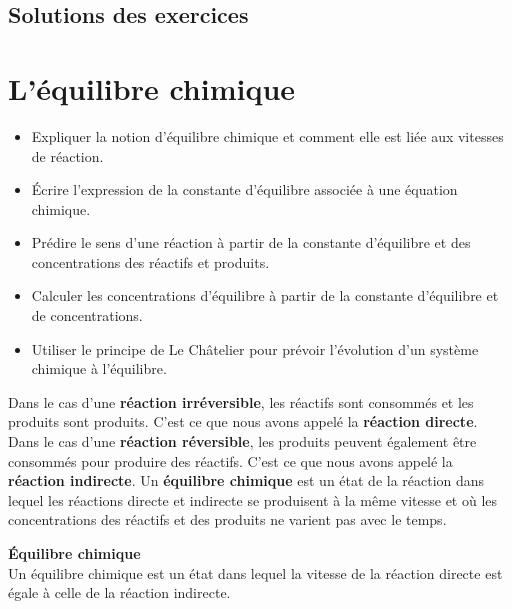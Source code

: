 \documentclass[
  11pt,
  french,
  a4paper,
  openany]{book}
\providecommand{\tightlist}{%
  \setlength{\itemsep}{0pt}\setlength{\parskip}{0pt}}
\begin{document}
\section{Solutions des exercices} \shipoutAnswer

\hypertarget{luxe9quilibre-chimique}{%
\chapter{L'équilibre chimique}\label{luxe9quilibre-chimique}}

\begin{objectives}

\begin{itemize}
\tightlist
\item
  Expliquer la notion d'équilibre chimique et comment elle est liée aux vitesses de réaction.
\item
  Écrire l'expression de la constante d'équilibre associée à une équation chimique.
\item
  Prédire le sens d'une réaction à partir de la constante d'équilibre et des concentrations des réactifs et produits.
\item
  Calculer les concentrations d'équilibre à partir de la constante d'équilibre et de concentrations.
\item
  Utiliser le principe de Le Châtelier pour prévoir l'évolution d'un système chimique à l'équilibre.
\end{itemize}


\end{objectives}

Dans le cas d'une \textbf{réaction irréversible}, les réactifs sont consommés et les produits sont produits. C'est ce que nous avons appelé la \textbf{réaction directe}. Dans le cas d'une \textbf{réaction réversible}, les produits peuvent également être consommés pour produire des réactifs. C'est ce que nous avons appelé la \textbf{réaction indirecte}. Un \textbf{équilibre chimique} est un état de la réaction dans lequel les réactions directe et indirecte se produisent à la même vitesse et où les concentrations des réactifs et des produits ne varient pas avec le temps.

\begin{tcolorbox}
\textbf{Équilibre chimique}\\
​Un équilibre chimique est un état dans lequel la vitesse de la réaction directe est égale à celle de la réaction indirecte.

\end{tcolorbox}
\end{document}
